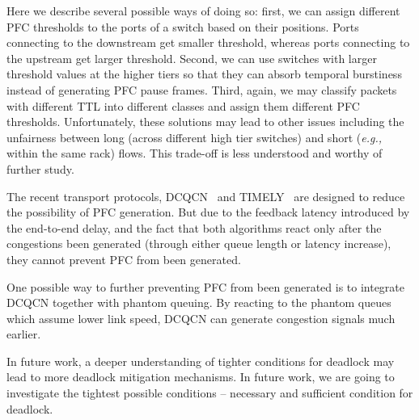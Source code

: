 Here we describe several possible ways of doing so: first, we can assign different PFC thresholds to 
the ports of a switch based on their positions. Ports connecting to the downstream get smaller threshold, 
whereas ports connecting to the upstream get larger threshold. 
Second, we can use switches with larger threshold values at the higher tiers so that they can absorb 
temporal burstiness instead of generating PFC pause frames. Third, again, we may classify 
packets with different TTL into different classes and assign them different PFC thresholds.
Unfortunately, these solutions may lead to other issues including the unfairness between long (across 
different high tier switches) and short ({\em e.g.,} within the same rack) flows. 
This trade-off is less understood and worthy of further study.




The recent transport protocols, DCQCN~\cite{dcqcn} and TIMELY~\cite{timely} are designed to reduce 
the possibility of PFC generation. But due to the feedback 
latency introduced by the end-to-end delay, and the fact that both algorithms react only after the 
congestions been generated (through either queue length or latency increase), they cannot prevent PFC 
from been generated. 

One possible way to further preventing PFC from been generated is to integrate DCQCN together with 
phantom queuing. By reacting to the phantom queues which assume lower link speed, DCQCN can generate 
congestion signals much earlier. 

 In future work, a deeper understanding of tighter conditions 
for deadlock may lead to more deadlock mitigation mechanisms. In future work, we are going to 
investigate the tightest possible conditions -- necessary and sufficient condition for deadlock. 